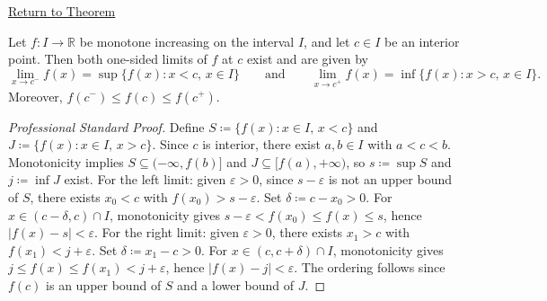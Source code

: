 \newpage
{}
\label{prf:monotone-one-sided-limits}

\begin{remark*}[Return]
\hyperref[thm:monotone-one-sided-limits]{Return to Theorem}
\end{remark*}

\begin{theorem*}
Let $f : I \to \mathbb{R}$ be monotone increasing on the interval $I$, and let $c \in I$ be an interior point. Then both one-sided limits of $f$ at $c$ exist and are given by
\[
  \lim_{x \to c^{-}} f(x) = \sup\{f(x) : x < c,\, x \in I\}
  \qquad \text{and} \qquad
  \lim_{x \to c^{+}} f(x) = \inf\{f(x) : x > c,\, x \in I\}.
\]
Moreover, $f(c^{-}) \leq f(c) \leq f(c^{+})$.
\end{theorem*}

\begin{proof}[Professional Standard Proof]
\LRAProofBodyStart
Define $S \coloneqq \{f(x) : x \in I,\, x < c\}$ and $J \coloneqq \{f(x) : x \in I,\, x > c\}$. Since $c$ is interior, there exist $a, b \in I$ with $a < c < b$. Monotonicity implies $S \subseteq (-\infty, f(b)]$ and $J \subseteq [f(a), +\infty)$, so $s \coloneqq \sup S$ and $j \coloneqq \inf J$ exist. For the left limit: given $\varepsilon > 0$, since $s - \varepsilon$ is not an upper bound of $S$, there exists $x_0 < c$ with $f(x_0) > s - \varepsilon$. Set $\delta \coloneqq c - x_0 > 0$. For $x \in (c - \delta, c) \cap I$, monotonicity gives $s - \varepsilon < f(x_0) \leq f(x) \leq s$, hence $|f(x) - s| < \varepsilon$. For the right limit: given $\varepsilon > 0$, there exists $x_1 > c$ with $f(x_1) < j + \varepsilon$. Set $\delta \coloneqq x_1 - c > 0$. For $x \in (c, c + \delta) \cap I$, monotonicity gives $j \leq f(x) \leq f(x_1) < j + \varepsilon$, hence $|f(x) - j| < \varepsilon$. The ordering follows since $f(c)$ is an upper bound of $S$ and a lower bound of $J$.
\end{proof}

